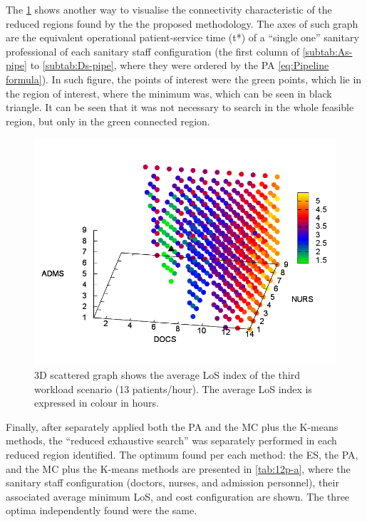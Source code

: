 \documentclass[11pt]{article} %
\begin{document}
The \ref{fig:3D-scattered-graph-75} shows another way to visualise
the connectivity characteristic of the reduced regions found by the
the proposed methodology. The axes of such graph are the equivalent
operational patient-service time \foreignlanguage{american}{(t{*})}
of a ``single one'' sanitary professional of each sanitary staff
configuration (the first column of \ref{subtab:As-pipe} to \ref{subtab:Ds-pipe},
where they were ordered by the PA \ref{eq:Pipeline formula}). In
such figure, the points of interest were the green points, which lie
in the region of interest, where the minimum was, which can be seen
in black triangle. It can be seen that it was not necessary to search
in the whole feasible region, but only in the green connected region.
\begin{figure}[h]
\noindent \centering{}\includegraphics[width=0.88\columnwidth,height=0.2\paperheight]{figs4/v0/6400-602-75-3D-scatter-LoS2}\caption{3D scattered graph shows the average LoS index of the third workload
scenario (13 patients/hour). The average LoS index is expressed in
colour in hours. \label{fig:3D-scattered-graph-75}}
\end{figure}


Finally, after separately applied both the PA and the MC plus the
K-means methods, the \textquotedblleft{}reduced exhaustive search\textquotedblright{}
was separately performed in each reduced region identified. The optimum
found per each method: the ES, the PA, and the MC plus the K-means
methods are presented in \ref{tab:12p-a}, where the sanitary staff
configuration (doctors, nurses, and admission personnel), their associated
average minimum LoS, and cost configuration are shown. The three optima
independently found were the same. 
\end{document}
